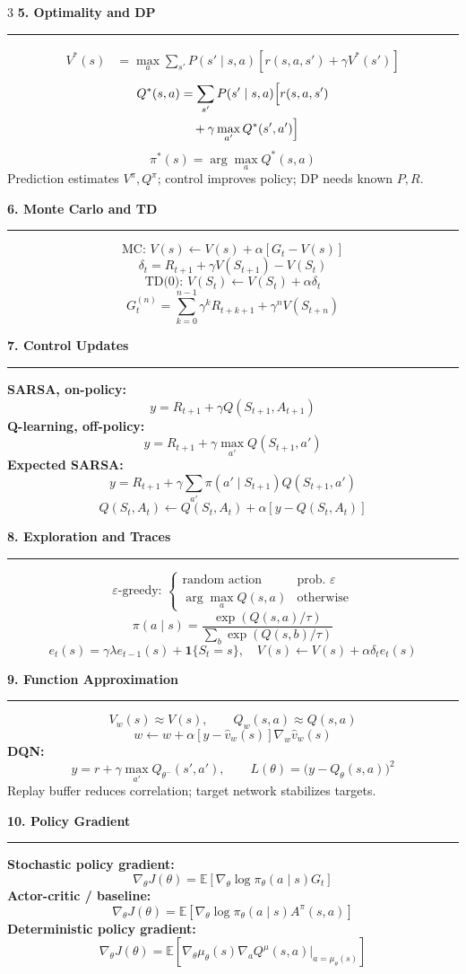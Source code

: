 \documentclass[a4paper]{article}
\newcommand{\sect}[1]{\vspace{2pt}\noindent\textbf{\large #1}\par\hrule\vspace{2pt}}
\begin{document}
\begin{multicols*}{3}
\sect{5. Optimality and DP}
\[
\begin{aligned}
V^*(s)
&=\max_a\sum_{s'}P(s'\mid s,a)
[r(s,a,s')+\gamma V^*(s')]
\end{aligned}
\]
\[
\begin{aligned}
Q^*(s,a)
&=\sum_{s'}P(s'\mid s,a)\Bigl[r(s,a,s')\\
&\quad+\gamma\max_{a'}Q^*(s',a')\Bigr]
\end{aligned}
\]
\[
\pi^*(s)=\arg\max_a Q^*(s,a)
\]
Prediction estimates $V^\pi,Q^\pi$; control improves policy; DP needs known $P,R$.

\sect{6. Monte Carlo and TD}
\[
\text{MC: }V(s)\leftarrow V(s)+\alpha[G_t-V(s)]
\]
\[
\delta_t=R_{t+1}+\gamma V(S_{t+1})-V(S_t)
\]
\[
\text{TD(0): }V(S_t)\leftarrow V(S_t)+\alpha\delta_t
\]
\[
G_t^{(n)}=\sum_{k=0}^{n-1}\gamma^kR_{t+k+1}+\gamma^nV(S_{t+n})
\]

\sect{7. Control Updates}
\textbf{SARSA, on-policy:}
\[
y=R_{t+1}+\gamma Q(S_{t+1},A_{t+1})
\]
\textbf{Q-learning, off-policy:}
\[
y=R_{t+1}+\gamma\max_{a'}Q(S_{t+1},a')
\]
\textbf{Expected SARSA:}
\[
y=R_{t+1}+\gamma\sum_{a'}\pi(a'\mid S_{t+1})Q(S_{t+1},a')
\]
\[
Q(S_t,A_t)\leftarrow Q(S_t,A_t)+\alpha[y-Q(S_t,A_t)]
\]

\sect{8. Exploration and Traces}
\[
\varepsilon\text{-greedy: }
\begin{cases}
\text{random action} & \text{prob. }\varepsilon\\
\arg\max_a Q(s,a) & \text{otherwise}
\end{cases}
\]
\[
\pi(a\mid s)=\frac{\exp(Q(s,a)/\tau)}{\sum_b\exp(Q(s,b)/\tau)}
\]
\[
e_t(s)=\gamma\lambda e_{t-1}(s)+\mathbf 1\{S_t=s\},\quad
V(s)\leftarrow V(s)+\alpha\delta_t e_t(s)
\]

\sect{9. Function Approximation}
\[
V_w(s)\approx V(s),\qquad Q_w(s,a)\approx Q(s,a)
\]
\[
w\leftarrow w+\alpha[y-\hat v_w(s)]\nabla_w\hat v_w(s)
\]
\textbf{DQN:}
\[
y=r+\gamma\max_{a'}Q_{\theta^-}(s',a'),\qquad
L(\theta)=\bigl(y-Q_\theta(s,a)\bigr)^2
\]
Replay buffer reduces correlation; target network stabilizes targets.

\sect{10. Policy Gradient}
\textbf{Stochastic policy gradient:}
\[
\nabla_\theta J(\theta)
=\mathbb E[\nabla_\theta\log\pi_\theta(a\mid s)G_t]
\]
\textbf{Actor-critic / baseline:}
\[
\nabla_\theta J(\theta)
=\mathbb E[\nabla_\theta\log\pi_\theta(a\mid s)A^\pi(s,a)]
\]
\textbf{Deterministic policy gradient:}
\[
\nabla_\theta J(\theta)
=\mathbb E\left[
\nabla_\theta\mu_\theta(s)
\nabla_a Q^\mu(s,a)\vert_{a=\mu_\theta(s)}
\right]
\]


\end{multicols*}
\end{document}

